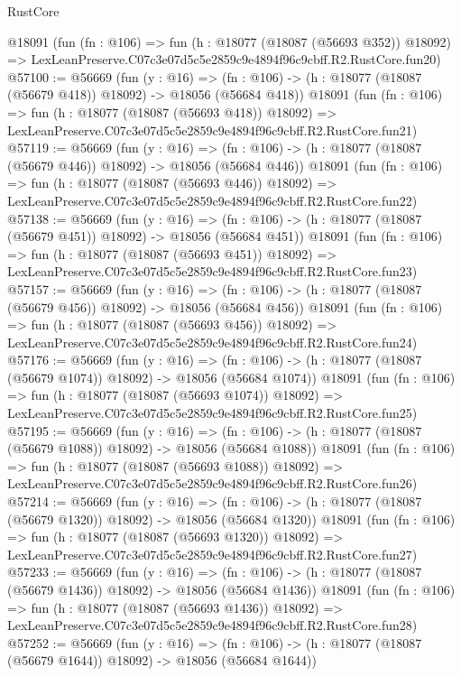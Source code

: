 \begin{lexlean}{RustCore}
\begin{coremodule}
    @18091
    (fun (fn : @106) =>
    fun (h : @18077 (@18087 (@56693 @352)) @18092) =>
    LexLeanPreserve.C07c3e07d5c5e2859c9e4894f96c9cbff.R2.RustCore.fun20)
@57100 := @56669
    (fun (y : @16) =>
    (fn : @106) -> (h : @18077 (@18087 (@56679 @418)) @18092) -> @18056 (@56684 @418))
    @18091
    (fun (fn : @106) =>
    fun (h : @18077 (@18087 (@56693 @418)) @18092) =>
    LexLeanPreserve.C07c3e07d5c5e2859c9e4894f96c9cbff.R2.RustCore.fun21)
@57119 := @56669
    (fun (y : @16) =>
    (fn : @106) -> (h : @18077 (@18087 (@56679 @446)) @18092) -> @18056 (@56684 @446))
    @18091
    (fun (fn : @106) =>
    fun (h : @18077 (@18087 (@56693 @446)) @18092) =>
    LexLeanPreserve.C07c3e07d5c5e2859c9e4894f96c9cbff.R2.RustCore.fun22)
@57138 := @56669
    (fun (y : @16) =>
    (fn : @106) -> (h : @18077 (@18087 (@56679 @451)) @18092) -> @18056 (@56684 @451))
    @18091
    (fun (fn : @106) =>
    fun (h : @18077 (@18087 (@56693 @451)) @18092) =>
    LexLeanPreserve.C07c3e07d5c5e2859c9e4894f96c9cbff.R2.RustCore.fun23)
@57157 := @56669
    (fun (y : @16) =>
    (fn : @106) -> (h : @18077 (@18087 (@56679 @456)) @18092) -> @18056 (@56684 @456))
    @18091
    (fun (fn : @106) =>
    fun (h : @18077 (@18087 (@56693 @456)) @18092) =>
    LexLeanPreserve.C07c3e07d5c5e2859c9e4894f96c9cbff.R2.RustCore.fun24)
@57176 := @56669
    (fun (y : @16) =>
    (fn : @106) -> (h : @18077 (@18087 (@56679 @1074)) @18092) -> @18056 (@56684 @1074))
    @18091
    (fun (fn : @106) =>
    fun (h : @18077 (@18087 (@56693 @1074)) @18092) =>
    LexLeanPreserve.C07c3e07d5c5e2859c9e4894f96c9cbff.R2.RustCore.fun25)
@57195 := @56669
    (fun (y : @16) =>
    (fn : @106) -> (h : @18077 (@18087 (@56679 @1088)) @18092) -> @18056 (@56684 @1088))
    @18091
    (fun (fn : @106) =>
    fun (h : @18077 (@18087 (@56693 @1088)) @18092) =>
    LexLeanPreserve.C07c3e07d5c5e2859c9e4894f96c9cbff.R2.RustCore.fun26)
@57214 := @56669
    (fun (y : @16) =>
    (fn : @106) -> (h : @18077 (@18087 (@56679 @1320)) @18092) -> @18056 (@56684 @1320))
    @18091
    (fun (fn : @106) =>
    fun (h : @18077 (@18087 (@56693 @1320)) @18092) =>
    LexLeanPreserve.C07c3e07d5c5e2859c9e4894f96c9cbff.R2.RustCore.fun27)
@57233 := @56669
    (fun (y : @16) =>
    (fn : @106) -> (h : @18077 (@18087 (@56679 @1436)) @18092) -> @18056 (@56684 @1436))
    @18091
    (fun (fn : @106) =>
    fun (h : @18077 (@18087 (@56693 @1436)) @18092) =>
    LexLeanPreserve.C07c3e07d5c5e2859c9e4894f96c9cbff.R2.RustCore.fun28)
@57252 := @56669
    (fun (y : @16) =>
    (fn : @106) -> (h : @18077 (@18087 (@56679 @1644)) @18092) -> @18056 (@56684 @1644))

\end{coremodule}
\end{lexlean}
